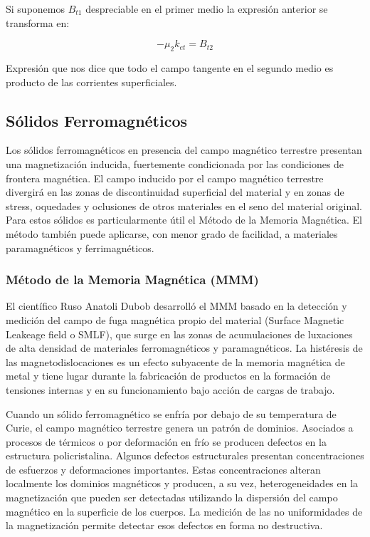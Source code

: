 Si suponemos $B_{t1}$ despreciable en el primer medio la expresión anterior se transforma en:

\begin{equation}
	\label{eq:53}
	 - \mu_{2} k_{et} = B_{t2}
\end{equation}

Expresión que nos dice que todo el campo tangente en el segundo medio es producto de las corrientes superficiales.

\subsection{Sólidos Ferromagnéticos}

Los sólidos ferromagnéticos en presencia del campo magnético terrestre presentan una magnetización inducida, fuertemente condicionada por las condiciones de frontera magnética. El campo inducido por el campo magnético terrestre divergirá en las zonas de discontinuidad superficial del material y en zonas de stress, oquedades y oclusiones de otros materiales en el seno del material original. Para estos sólidos es particularmente útil el Método de la Memoria Magnética. El método también puede aplicarse, con menor grado de facilidad, a materiales paramagnéticos y ferrimagnéticos.

\subsubsection{Método de la Memoria Magnética (MMM)}

El científico Ruso Anatoli Dubob desarrolló el MMM basado en la detección y medición del campo de fuga magnética propio del material (Surface Magnetic Leakeage field o SMLF), que surge en las zonas de acumulaciones de luxaciones de alta densidad de materiales ferromagnéticos y paramagnéticos. La histéresis de las magnetodislocaciones es un efecto subyacente de la memoria magnética de metal y tiene lugar durante la fabricación de productos en la formación de tensiones internas y en su funcionamiento bajo acción de cargas de trabajo. 

Cuando un sólido ferromagnético se enfría por debajo de su temperatura de Curie, el campo magnético terrestre genera un patrón de dominios. Asociados a procesos de térmicos o por deformación en frío se producen defectos en la estructura policristalina. Algunos defectos estructurales presentan concentraciones de esfuerzos y deformaciones importantes. Estas concentraciones alteran localmente los dominios magnéticos y producen, a su vez, heterogeneidades en la magnetización que pueden ser detectadas utilizando la dispersión del campo magnético en la superficie de los cuerpos. La medición de las no uniformidades de la magnetización permite detectar esos defectos en forma no destructiva. 

